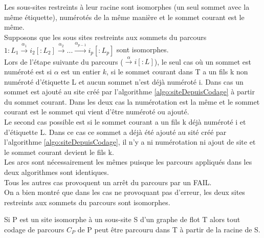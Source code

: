 \begin{pr}
 Les sous-sites restreints à leur racine sont isomorphes (un seul sommet avec la même étiquette), numérotés de la même manière et le sommet courant est le même.\\
 Supposons que les sous sites restreints aux sommets du parcours $1:L_1\xrightarrow{\alpha_1}i_2[:L_2]\xrightarrow{\alpha_2} ...\xrightarrow{\alpha_{p-1}}i_{p}[:L_{p}]$ sont isomorphes.\\
 Lors de l'étape suivante du parcours ($\xrightarrow{\alpha}i[:L]$), le seul cas où un sommet est numéroté est si $\alpha$ est un entier $k$, si le sommet courant dans T a un fils k non numéroté d'étiquette L et aucun sommet n'est déjà numéroté i. Dans cas un sommet est ajouté au site créé par l'algorithme \ref{algo:siteDepuisCodage} à partir du sommet courant. Dans les deux cas la numérotation est la même et le sommet courant est le sommet qui vient d'être numéroté ou ajouté.\\
 Le second cas possible est si le sommet courant a un fils k déjà numéroté i et d'étiquette L. Dans ce cas ce sommet a déjà été ajouté au sité créé par l'algorithme \ref{algo:siteDepuisCodage}, il n'y a ni numérotation ni ajout de site et le sommet courant devient le fils k.\\
  Les arcs sont nécessairement les mêmes puisque les parcours appliqués dans les deux algorithmes sont identiques. \\
 Tous les autres cas provoquent un arrêt du parcours par un FAIL. \\
 On a bien montré que dans les cas ne provoquant pas d'erreur, les deux sites restreints aux sommets du parcours sont isomorphes.
\end{pr}

\begin{prop}
 Si P est un site isomorphe à un sous-site S d'un graphe de flot T alors tout codage de parcours $C_P$ de P peut être parcouru dans T à partir de la racine de S.
 \label{prop:isoDoncCodage}
\end{prop}

